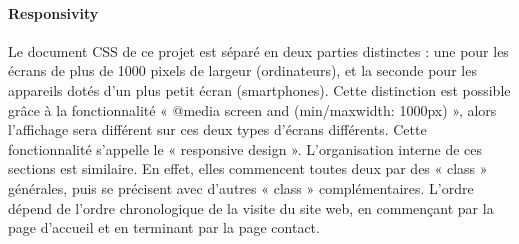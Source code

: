 \documentclass[a4,10pt,french]{sphinxmanual}
\begin{document}
\paragraph{Responsivity}
\label{\detokenize{chapitre-02:responsivity}}
\sphinxAtStartPar
Le document CSS de ce projet est séparé en deux parties distinctes : une pour les écrans de plus de 1000 pixels de largeur (ordinateurs), et la seconde pour les appareils dotés d’un plus petit écran (smartphones). Cette distinction est possible grâce à la fonctionnalité « @media screen and (min/max\sphinxhyphen{}width: 1000px) », alors l’affichage sera différent sur ces deux types d’écrans différents. Cette fonctionnalité s’appelle le « responsive design ». L’organisation interne de ces sections est similaire. En effet, elles commencent toutes deux par des « class » générales, puis se précisent avec d’autres « class » complémentaires. L’ordre dépend de l’ordre chronologique de la visite du site web, en commençant par la page d’accueil et en terminant par la page contact.
\end{document}
